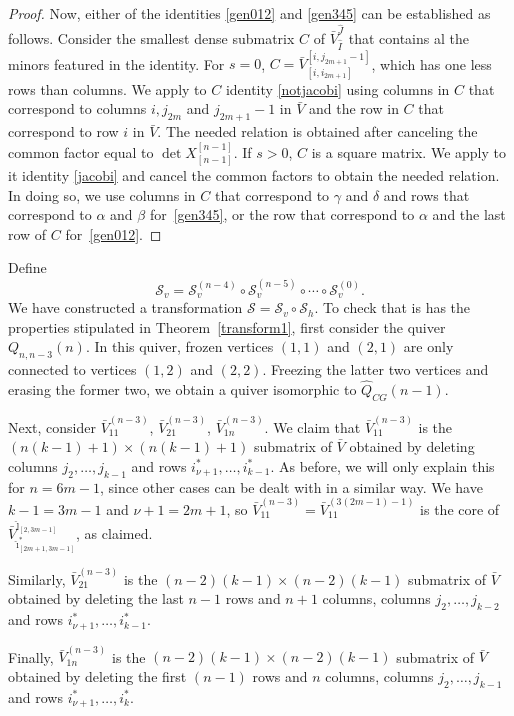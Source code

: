 \documentclass{amsart}
\theoremstyle{definition}
\theoremstyle{remark}
\numberwithin{equation}{section}
\numberwithin{theorem}{section}
\begin{document}
\begin{proof}
 Now, either of the identities \eqref{gen012} and \eqref{gen345}
 can be established as follows. Consider the smallest dense submatrix  $C$ of $\bar V_{\hat I}^{\hat J}$ that contains al the minors  featured in the identity. For $s=0$, $C=\bar V_{[i,i_{2m+1}]}^{[i, j_{2m+1}-1]}$, which has one less rows than columns. We apply to $C$ identity \eqref{notjacobi} using columns in $C$ that correspond to columns $i, j_{2m}$ and $j_{2m+1}-1$ in $\bar V$ and the row in $C$ that correspond
 to row $i$ in $\bar V$. The needed relation is obtained after canceling the common factor  equal to $\det X_{[n-1]}^{[n-1]}$.
  If $s>0$, $C$ is a square matrix. We apply to it identity \eqref{jacobi} and cancel the common factors
 to obtain the needed relation. In doing so, we use columns in $C$ that correspond to $\gamma$ and $\delta$ and rows that correspond to $\alpha$ and $\beta$ for~\eqref{gen345}, or the row that 
 correspond to $\alpha$ and the last row of $C$ for~\eqref{gen012}.
\end{proof}

Define
$$
\mathcal S_v = \mathcal S_v^{(n-4)}\circ \mathcal S_v^{(n-5)}\circ \cdots \circ
\mathcal S_v^{(0)}.
$$
We have constructed a transformation $\mathcal S=\mathcal S_v\circ \mathcal S_h$.
To check that is has the properties stipulated in Theorem~\ref{transform1}, first consider the quiver  $Q_{n,n-3}(n)$. In this
quiver, frozen vertices $(1,1)$ and $(2,1)$ are only
connected to vertices $(1,2)$ and $(2,2)$. Freezing the latter two vertices and
erasing the former two, we obtain a quiver
isomorphic to $\hat Q_{CG}(n-1)$.

Next, consider  $\bar V_{11}^{(n-3)}$,  $\bar V_{21}^{(n-3)}$, $\bar  V_{1n}^{(n-3)}$.
We claim that
$\bar V_{11}^{(n-3)}$ is the $(n (k-1)+1)\times (n (k-1)+1)$ submatrix of $\bar V$  
obtained by deleting columns $j_2,\ldots, j_{k-1}$ and rows $i^*_{\nu +1}, 
\ldots, i^*_{k-1}$. As before, we will only
explain this for $n=6m-1$, since other cases can be dealt with in a similar way. We have $k-1= 3m -1$ and
$\nu+1=2m+1$, so 
$\bar V_{11}^{(n-3)}= \bar V_{11}^{(3(2m - 1) - 1)} $ is the core of $\bar V^{\hat \jmath_{[2,3m-1]}}_{ \hat \imath^*_{[2m+1,3m-1]}}$, as claimed.

 Similarly, $\bar V_{21}^{(n-3)}$ is the
 $(n-2)(k-1)\times (n-2)(k-1)$ submatrix of $\bar V$ obtained by deleting  
 the last $n-1$ rows and $n+1$ columns, columns $j_2,\ldots, j_{k-2}$ and rows $i^*_{\nu+1}, \ldots,i^*_{k-1}$.
 
Finally,  $\bar V_{1n}^{(n-3)}$ is the
 $(n-2)(k-1)\times (n-2)(k-1)$ submatrix of $\bar V$ obtained by deleting  
 the first $(n-1)$ rows and $n$ columns, columns $j_2,\ldots, j_{k-1}$ and rows $i^*_{\nu+1}, \ldots,i^*_{k}$. 
 
\end{document}
